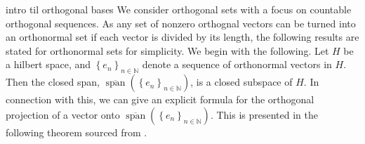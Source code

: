 \documentclass[../thesis.tex]{subfiles}
\begin{document}
intro til orthogonal bases 
%
%
We consider orthogonal sets with a focus on countable orthogonal sequences. As any set of nonzero orthognal vectors can be turned into an orthonormal set if each vector is divided by its length, the following results are stated for orthonormal sets for simplicity. 
We begin with the following. Let $H$ be a hilbert space, and $\left\{ e_{n} \right\}_{n\in \mathbb{N}}$ denote a sequence of orthonormal vectors in $H$. Then the closed span, $\overline{\operatorname{span}}\left( \left\{ e_{n} \right\}_{n\in \mathbb{N}} \right)$, is a closed subspace of $H$. In connection with this, we can give an explicit formula for the orthogonal projection of a vector onto $\overline{\operatorname{span}}\left( \left\{ e_{n} \right\}_{n\in \mathbb{N}} \right)$. This is presented in the following theorem sourced from \cite{heilMetricsNormsInner2018}.
%
%
\end{document}
